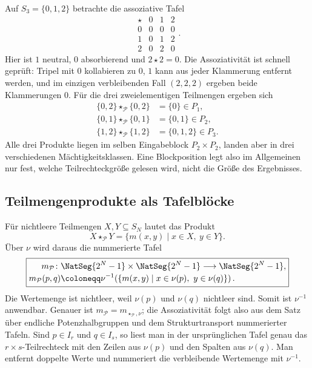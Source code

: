 \documentclass[main.tex]{subfiles}
\begin{document}
\begin{example}
Auf \(S_3=\{0,1,2\}\) betrachte die assoziative Tafel
\[
\begin{array}{c|ccc}
\star&0&1&2\\\hline
0&0&0&0\\
1&0&1&2\\
2&0&2&0
\end{array}.
\]
Hier ist \(1\) neutral, \(0\) absorbierend und \(2\star2=0\).  Die
Assoziativität ist schnell geprüft: Tripel mit \(0\) kollabieren zu \(0\),
\(1\) kann aus jeder Klammerung entfernt werden, und im einzigen verbleibenden
Fall \((2,2,2)\) ergeben beide Klammerungen \(0\).  Für die drei
zweielementigen Teilmengen ergeben sich
\[
\begin{aligned}
  \{0,2\}\star_{\mathcal P}\{0,2\}&=\{0\}\in P_1,\\
  \{0,1\}\star_{\mathcal P}\{0,1\}&=\{0,1\}\in P_2,\\
  \{1,2\}\star_{\mathcal P}\{1,2\}&=\{0,1,2\}\in P_3.
\end{aligned}
\]
Alle drei Produkte liegen im selben Eingabeblock \(P_2\times P_2\), landen
aber in drei verschiedenen Mächtigkeitsklassen.  Eine Blockposition legt
also im Allgemeinen nur fest, welche Teilrechteckgröße gelesen wird, nicht
die Größe des Ergebnisses.
\end{example}


\subsection{Teilmengenprodukte als Tafelblöcke}

Für nichtleere Teilmengen \(X,Y\subseteq S_N\) lautet das Produkt
\[
  X\star_{\mathcal P}Y
  =
  \{m(x,y)\mid x\in X,\ y\in Y\}.
\]
Über \(\nu\) wird daraus die nummerierte Tafel
\[
  \boxed{
  \begin{aligned}
  m_{\mathcal P}\colon{}
    &\NatSeg{2^N-1}\times\NatSeg{2^N-1}
      \longrightarrow\NatSeg{2^N-1},\\[-2pt]
  m_{\mathcal P}(p,q)
    &\coloneqq
      \nu^{-1}\!\left(
        \{m(x,y)\mid x\in\nu(p),\ y\in\nu(q)\}
      \right).
  \end{aligned}}
\]
Die Wertemenge ist nichtleer, weil \(\nu(p)\) und \(\nu(q)\) nichtleer
sind.  Somit ist \(\nu^{-1}\) anwendbar.  Genauer ist
\(m_{\mathcal P}=m_{\star_{\mathcal P},\nu}\); die Assoziativität folgt
also aus dem Satz über endliche Potenzhalbgruppen und dem Strukturtransport
nummerierter Tafeln.
Sind \(p\in I_r\) und \(q\in I_s\), so liest man in der ursprünglichen
Tafel genau das \(r\times s\)-Teilrechteck mit den Zeilen aus \(\nu(p)\) und
den Spalten aus \(\nu(q)\).  Man entfernt doppelte Werte und nummeriert die
verbleibende Wertemenge mit \(\nu^{-1}\).
\end{document}
